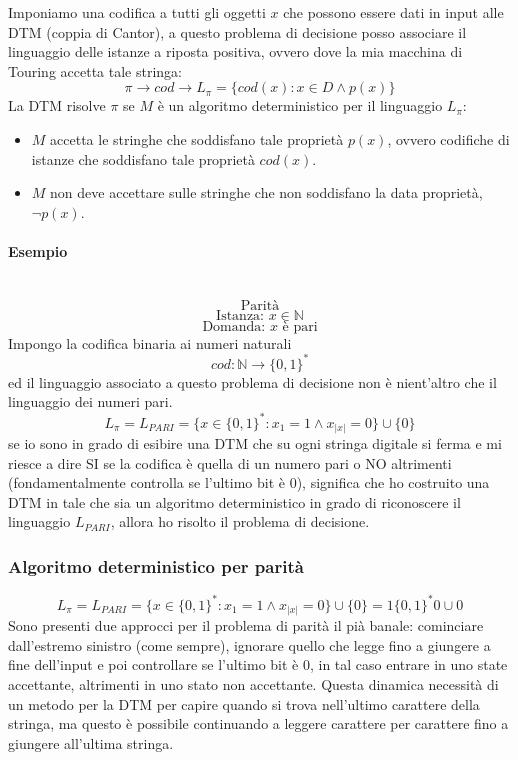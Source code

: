 \documentclass{article}
\begin{document}
Imponiamo una codifica a tutti gli oggetti $x$ che possono essere dati in input alle DTM
(coppia di Cantor), a questo problema di decisione posso associare il linguaggio delle istanze
a riposta positiva, ovvero dove la mia macchina di Touring accetta tale stringa:
$$\pi\rightarrow cod\rightarrow L_\pi=\{cod(x):x\in D\land p(x)\}$$
La DTM risolve $\pi$ se $M$ è un algoritmo deterministico per il linguaggio $L_\pi$:
\begin{itemize}
    \item $M$ accetta le stringhe che soddisfano tale proprietà $p(x)$,
          ovvero codifiche di istanze che soddisfano tale proprietà $cod(x)$.
    \item $M$ non deve accettare sulle stringhe che non soddisfano la data proprietà,
          $\lnot p(x)$.
\end{itemize}
\paragraph{Esempio}\mbox{}\\
$$\text{Parità}$$
$$\text{Istanza: }x\in\mathbb{N}$$
$$\text{Domanda: }x\text{ è pari}$$
Impongo la codifica binaria ai numeri naturali
$$cod:\mathbb{N}\rightarrow\{0,1\}^*$$
ed il linguaggio associato a questo problema di decisione non è nient'altro che il linguaggio
dei numeri pari.
$$L_\pi=L_{PARI}=\{x\in\{0,1\}^*:x_1=1\land x_{|x|}=0\}\cup\{0\}$$
se io sono in grado di esibire una DTM che su ogni stringa digitale si ferma e mi riesce a
dire SI se la codifica è quella di un numero pari o NO altrimenti (fondamentalmente
controlla se l'ultimo bit è 0), significa che ho costruito una DTM
in tale che sia un algoritmo deterministico in grado
di riconoscere il linguaggio $L_{PARI}$, allora ho risolto il problema di decisione.

\subsubsection{Algoritmo deterministico per parità}
$$L_\pi=L_{PARI}=\{x\in\{0,1\}^*:x_1=1\land x_{|x|}=0\}\cup\{0\}=1\{0,1\}^*0\cup 0$$
Sono presenti due approcci per il problema di parità il pià banale:
cominciare dall'estremo sinistro (come sempre), ignorare quello che legge
fino a giungere a fine dell'input e poi controllare se l'ultimo bit è 0,
in tal caso entrare in uno state accettante, altrimenti in uno stato
non accettante. Questa dinamica necessità di un metodo per la DTM
per capire quando si trova nell'ultimo carattere della stringa,
ma questo è possibile continuando a leggere carattere per carattere fino a
giungere all'ultima stringa.
\end{document}
